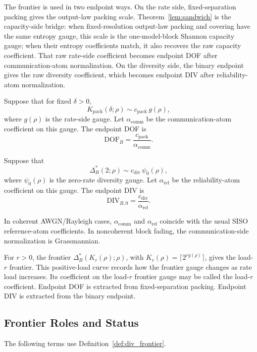 \documentclass[lettersize,onecolumn]{IEEEtran}
\newcommand{\snr}{\rho}
\begin{document}
The frontier is used in two endpoint ways. On the rate side,
fixed-separation packing gives the output-law packing scale.
Theorem~\ref{lem:sandwich} is the capacity-side bridge: when
fixed-resolution output-law packing and covering have the same entropy
gauge, this scale is the one-model-block Shannon capacity gauge; when
their entropy coefficients match, it also recovers the raw capacity
coefficient. That raw rate-side coefficient becomes endpoint DOF after
communication-atom normalization. On the diversity side, the binary
endpoint gives the raw diversity coefficient, which becomes endpoint
DIV after reliability-atom normalization.

Suppose that for fixed $\delta > 0$,
\[
  K_{\mathrm{pack}}(\delta;\snr) \sim c_{\mathrm{pack}}\,g(\snr),
\]
where $g(\snr)$ is the rate-side gauge. Let
$\alpha_{\mathrm{comm}}$ be the communication-atom coefficient on
this gauge. The endpoint DOF is
\[
  \mathrm{DOF}_B = \frac{c_{\mathrm{pack}}}{\alpha_{\mathrm{comm}}}.
\]

Suppose that
\[
  \Delta_B^*(2;\snr) \sim c_{\mathrm{div}}\,\psi_0(\snr),
\]
where $\psi_0(\snr)$ is the zero-rate diversity gauge. Let
$\alpha_{\mathrm{rel}}$ be the reliability-atom coefficient on this
gauge. The endpoint DIV is
\[
  \mathrm{DIV}_{B,0} = \frac{c_{\mathrm{div}}}{\alpha_{\mathrm{rel}}}.
\]

In coherent AWGN/Rayleigh cases, $\alpha_{\mathrm{comm}}$ and
$\alpha_{\mathrm{rel}}$ coincide with the usual SISO reference-atom
coefficients. In noncoherent block fading, the communication-side
normalization is Grassmannian.

For $r > 0$, the frontier
$\Delta_B^*(K_r(\snr);\snr)$, with
$K_r(\snr) = \lceil 2^{r g(\snr)}\rceil$, gives the load-$r$
frontier. This positive-load curve records how the frontier gauge
changes as rate load increases. Its coefficient on the load-$r$ frontier gauge may be called the
load-$r$ coefficient. Endpoint DOF is extracted from fixed-separation
packing. Endpoint DIV is extracted from the binary endpoint.

\subsection{Frontier Roles and Status}\label{subsec:status_labels}

The following terms use Definition~\ref{def:div_frontier}.
\end{document}
